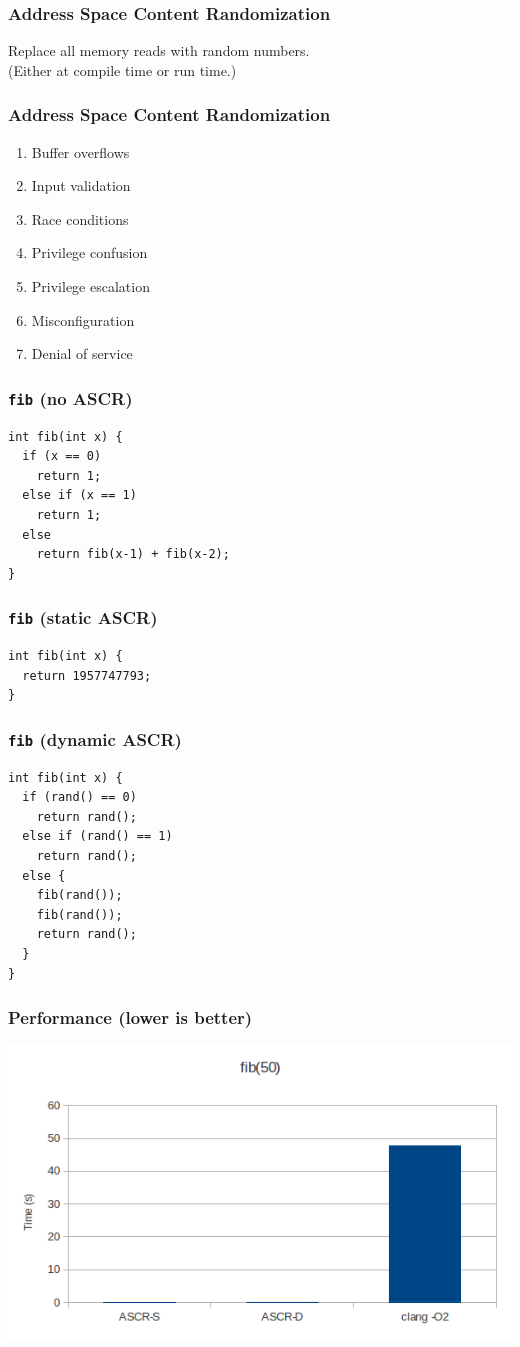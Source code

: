 \documentclass{beamer}
\renewcommand{\t}{\texttt}
\begin{document}
\begin{frame}
\frametitle{Address Space Content Randomization}
Replace all memory reads with random numbers. \\
(Either at compile time or run time.)
\end{frame}

\begin{frame}
\frametitle{Address Space Content Randomization}
\begin{enumerate}[$\CheckedBox$]
\item Buffer overflows
\item Input validation
\item Race conditions
\item Privilege confusion
\item Privilege escalation
\item Misconfiguration
\item Denial of service
\end{enumerate}
\end{frame}

\begin{frame}[fragile]
\frametitle{\t{fib} (no ASCR)}
\begin{verbatim}
int fib(int x) {
  if (x == 0)
    return 1;
  else if (x == 1)
    return 1;
  else
    return fib(x-1) + fib(x-2);
}
\end{verbatim}
\end{frame}

\begin{frame}[fragile]
\frametitle{\t{fib} (static ASCR)}
\begin{verbatim}
int fib(int x) {
  return 1957747793;
}
\end{verbatim}
\end{frame}

\begin{frame}[fragile]
\frametitle{\t{fib} (dynamic ASCR)}
\begin{verbatim}
int fib(int x) {
  if (rand() == 0)
    return rand();
  else if (rand() == 1)
    return rand();
  else {
    fib(rand());
    fib(rand());
    return rand();
  }
}
\end{verbatim}
\end{frame}

\begin{frame}
\frametitle{Performance (lower is better)}
\centering
\includegraphics[scale=.5]{../performance.png}
\end{frame}
\end{document}
